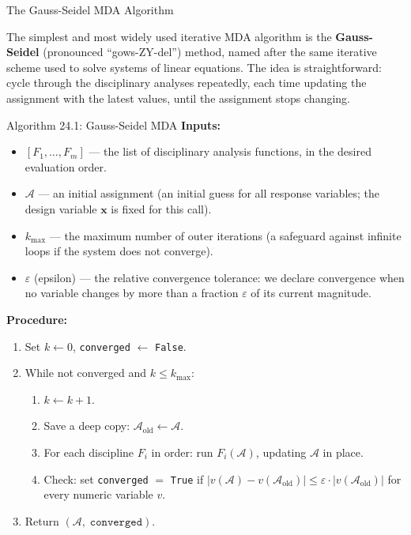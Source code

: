 \documentclass[aspectratio=169,10pt]{beamer}
\begin{document}
\begin{frame}[allowframebreaks]{The Gauss-Seidel MDA Algorithm}

  The simplest and most widely used iterative MDA algorithm is the
  \textbf{Gauss-Seidel} (pronounced ``gows-ZY-del'') method, named after
  the same iterative scheme used to solve systems of linear equations.
  The idea is straightforward: cycle through the disciplinary analyses
  repeatedly, each time updating the assignment with the latest values,
  until the assignment stops changing.

  \begin{block}{Algorithm 24.1: Gauss-Seidel MDA}
    \textbf{Inputs:}
    \begin{itemize}
      \item $[F_1, \ldots, F_m]$ --- the list of disciplinary analysis
            functions, in the desired evaluation order.
      \item $\mathcal{A}$ --- an initial assignment (an initial guess for
            all response variables; the design variable $\mathbf{x}$ is
            fixed for this call).
      \item $k_{\max}$ --- the maximum number of outer iterations (a
            safeguard against infinite loops if the system does not converge).
      \item $\varepsilon$ (epsilon) --- the relative convergence tolerance:
            we declare convergence when no variable changes by more than a
            fraction $\varepsilon$ of its current magnitude.
    \end{itemize}
    \textbf{Procedure:}
    \begin{enumerate}
      \item Set $k \leftarrow 0$, \texttt{converged} $\leftarrow$
            \texttt{False}.
      \item While not converged and $k \leq k_{\max}$:
        \begin{enumerate}
          \item $k \leftarrow k + 1$.
          \item Save a deep copy: $\mathcal{A}_{\text{old}} \leftarrow
                \mathcal{A}$.
          \item For each discipline $F_i$ in order: run $F_i(\mathcal{A})$,
                updating $\mathcal{A}$ in place.
          \item Check: set \texttt{converged} $=$ \texttt{True} if
                $|v(\mathcal{A}) - v(\mathcal{A}_{\text{old}})| \leq
                \varepsilon \cdot |v(\mathcal{A}_{\text{old}})|$ for
                every numeric variable $v$.
        \end{enumerate}
      \item Return $(\mathcal{A},\; \texttt{converged})$.
    \end{enumerate}
  \end{block}


\end{frame}
\end{document}
